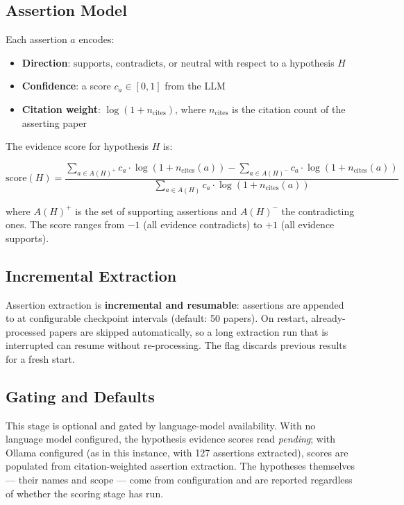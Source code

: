 \documentclass[
  english,
]{article}
\providecommand{\tightlist}{%
  \setlength{\itemsep}{0pt}\setlength{\parskip}{0pt}}
\begin{document}
\subsection{Assertion Model}\label{assertion-model}

Each assertion \(a\) encodes:

\begin{itemize}
\tightlist
\item
  \textbf{Direction}: \(\text{supports}\), \(\text{contradicts}\), or
  \(\text{neutral}\) with respect to a hypothesis \(H\)
\item
  \textbf{Confidence}: a score \(c_a \in [0, 1]\) from the LLM
\item
  \textbf{Citation weight}: \(\log(1 + n_{\text{cites}})\), where
  \(n_{\text{cites}}\) is the citation count of the asserting paper
\end{itemize}

The evidence score for hypothesis \(H\) is:

\[
\text{score}(H) = \frac{\sum_{a \in A(H)^+} c_a \cdot \log(1 + n_{\text{cites}}(a)) -
\sum_{a \in A(H)^-} c_a \cdot \log(1 + n_{\text{cites}}(a))}
{\sum_{a \in A(H)} c_a \cdot \log(1 + n_{\text{cites}}(a))}
\]

where \(A(H)^+\) is the set of supporting assertions and \(A(H)^-\) the
contradicting ones. The score ranges from \(-1\) (all evidence
contradicts) to \(+1\) (all evidence supports).

\subsection{Incremental Extraction}\label{incremental-extraction}

Assertion extraction is \textbf{incremental and resumable}: assertions
are appended to  at configurable
checkpoint intervals (default: 50 papers). On restart, already-processed
papers are skipped automatically, so a long extraction run that is
interrupted can resume without re-processing. The
 flag discards previous results for a fresh
start.

\subsection{Gating and Defaults}\label{gating-and-defaults}

This stage is optional and gated by language-model availability. With no
language model configured, the hypothesis evidence scores read
\emph{pending}; with Ollama configured (as in this instance, with 127
assertions extracted), scores are populated from citation-weighted
assertion extraction. The hypotheses themselves --- their names and
scope --- come from configuration and are reported regardless of whether
the scoring stage has run.
\end{document}
